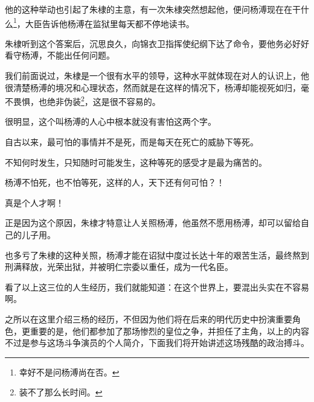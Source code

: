 \begin{multicols}{\theparacolNo}
他的这种举动也引起了朱棣的主意，有一次朱棣突然想起他，便问杨溥现在在干什么\footnote{幸好不是问杨溥尚在否。}，大臣告诉他杨溥在监狱里每天都不停地读书。

朱棣听到这个答案后，沉思良久，向锦衣卫指挥使纪纲下达了命令，要他务必好好看守杨溥，不能出任何问题。

我们前面说过，朱棣是一个很有水平的领导，这种水平就体现在对人的认识上，他很清楚杨溥的境况和心理状态，然而就是在这样的情况下，杨溥却能视死如归，毫不畏惧，也绝非伪装\footnote{装不了那么长时间。}，这是很不容易的。

很明显，这个叫杨溥的人心中根本就没有害怕这两个字。

自古以来，最可怕的事情并不是死，而是每天在死亡的威胁下等死。

不知何时发生，只知随时可能发生，这种等死的感受才是最为痛苦的。

杨溥不怕死，也不怕等死，这样的人，天下还有何可怕？！

真是个人才啊！

正是因为这个原因，朱棣才特意让人关照杨溥，他虽然不愿用杨溥，却可以留给自己的儿子用。

也多亏了朱棣的这种关照，杨溥才能在诏狱中度过长达十年的艰苦生活，最终熬到刑满释放，光荣出狱，并被明仁宗委以重任，成为一代名臣。

看了以上这三位的人生经历，我们就能知道：在这个世界上，要混出头实在不容易啊。

之所以在这里介绍三杨的经历，不但因为他们将在后来的明代历史中扮演重要角色，更重要的是，他们都参加了那场惨烈的皇位之争，并担任了主角，以上的内容不过是参与这场斗争演员的个人简介，下面我们将开始讲述这场残酷的政治搏斗。
\ifnum{}
	\end{multicols}
\fi
\newpage
